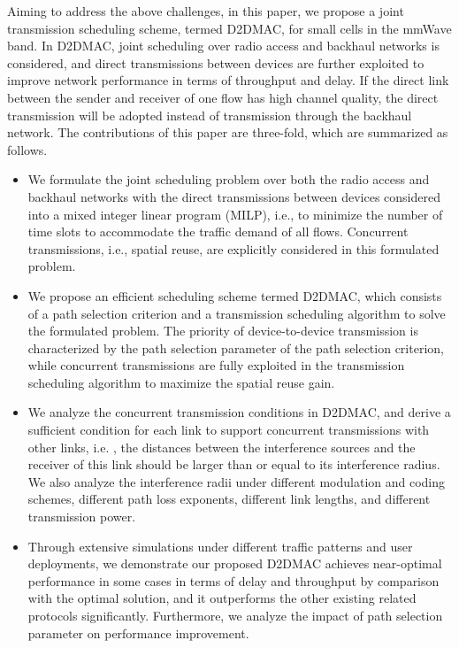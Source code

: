 \documentclass[journal]{IEEEtran}
\begin{document}
Aiming to address the above challenges, in this paper, we propose a joint transmission scheduling
scheme, termed D2DMAC, for small cells in the mmWave band. In D2DMAC, joint scheduling over radio
access and backhaul networks is considered, and direct transmissions between devices are further
exploited to improve network performance in terms of throughput and delay. If the direct link
between the sender and receiver of one flow has high channel quality, the direct transmission will
be adopted instead of transmission through the backhaul network. The contributions of this paper
are three-fold, which are summarized as follows.


\begin{itemize}
\item We formulate the joint scheduling problem over both the radio access and backhaul networks with the direct transmissions between devices considered into a mixed integer
linear program (MILP), i.e., to minimize the number of time slots to accommodate the traffic
demand of all flows. Concurrent transmissions, i.e., spatial reuse, are explicitly considered in
this formulated problem.
\item We propose an efficient scheduling scheme termed D2DMAC, which consists of a path selection criterion and a transmission scheduling algorithm to solve the formulated problem.
The priority of device-to-device transmission is characterized by the path selection parameter of
the path selection criterion, while concurrent transmissions are fully exploited in the transmission
scheduling algorithm to maximize the spatial reuse gain.
\item We analyze the concurrent transmission conditions in D2DMAC, and derive a sufficient condition for each link to support concurrent transmissions with other links, i.e. , the distances between the interference sources and the receiver of this link should be larger than or equal to its interference radius. We also analyze the interference radii under different modulation and coding schemes, different path loss exponents, different link lengths, and different transmission power.
\item Through extensive simulations under different traffic patterns and user deployments, we demonstrate our proposed D2DMAC achieves near-optimal performance in some cases in terms of delay and throughput by comparison with the optimal solution, and
it outperforms the other existing related protocols significantly. Furthermore, we analyze the
impact of path selection parameter on performance improvement.



\end{itemize}
\end{document}
